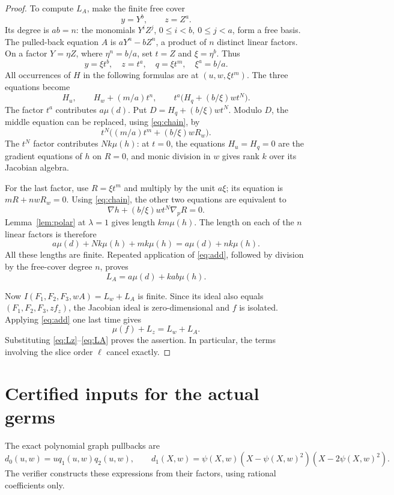 \documentclass[11pt]{article}
\begin{document}
\begin{proof}
To compute \(L_A\), make the finite free cover
\[
 y=Y^b,\qquad z=Z^a.
\]
Its degree is \(ab=n\): the monomials \(Y^iZ^j\),
\(0\le i<b,\ 0\le j<a\), form a free basis.
The pulled-back equation \(A\) is
\(aY^n-bZ^n\), a product of \(n\) distinct linear factors.
On a factor \(Y=\eta Z\), where \(\eta^n=b/a\), set \(t=Z\)
and \(\xi=\eta^b\).  Thus
\[
 y=\xi t^b,\quad z=t^a,\quad
 q=\xi t^m,\quad \xi^a=b/a.
\]
All occurrences of \(H\) in the following formulas are at
\((u,w,\xi t^m)\).  The three equations become
\[
 H_u,\qquad H_w+(m/a)t^n,\qquad
 t^a\bigl(H_q+(b/\xi)wt^N\bigr).
\]
The factor \(t^a\) contributes \(a\mu(d)\).
Put \(D=H_q+(b/\xi)wt^N\).  Modulo \(D\), the middle equation
can be replaced, using \eqref{eq:chain}, by
\[
 t^N\bigl((m/a)t^m+(b/\xi)wR_w\bigr).
\]
The \(t^N\) factor contributes \(Nk\mu(h)\):
at \(t=0\), the equations \(H_u=H_q=0\) are the gradient
equations of \(h\) on \(R=0\), and monic division in \(w\)
gives rank \(k\) over its Jacobian algebra.

For the last factor, use \(R=\xi t^m\) and multiply by the unit
\(a\xi\); its equation is \(mR+nwR_w=0\).
Using \eqref{eq:chain}, the other two equations are equivalent to
\[
 \nabla h+(b/\xi)wt^N\nabla_pR=0.
\]
Lemma~\ref{lem:polar} at \(\lambda=1\) gives length \(km\mu(h)\).
The length on each of the \(n\) linear factors is therefore
\[
 a\mu(d)+Nk\mu(h)+mk\mu(h)=a\mu(d)+nk\mu(h).
\]
All these lengths are finite.  Repeated application of
\eqref{eq:add}, followed by division by the free-cover degree
\(n\), proves
\begin{equation}\label{eq:LA}
 L_A=a\mu(d)+kab\mu(h).
\end{equation}

Now \(I(F_1,F_2,F_3,wA)=L_w+L_A\) is finite.  Since its ideal
also equals \((F_1,F_2,F_3,zf_z)\), the Jacobian ideal is
zero-dimensional and \(f\) is isolated.  Applying
\eqref{eq:add} one last time gives
\[
 \mu(f)+L_z=L_w+L_A.
\]
Substituting \eqref{eq:Lz}--\eqref{eq:LA} proves the assertion.
In particular, the terms involving the slice order \(\ell\)
cancel exactly.
\end{proof}

\section{Certified inputs for the actual germs}

The exact polynomial graph pullbacks are
\[
 d_0(u,w)=u q_1(u,w)q_2(u,w),\qquad
 d_1(X,w)=\psi(X,w)(X-\psi(X,w)^2)(X-2\psi(X,w)^2).
\]
The verifier constructs these expressions from their factors,
using rational coefficients only.
\end{document}
